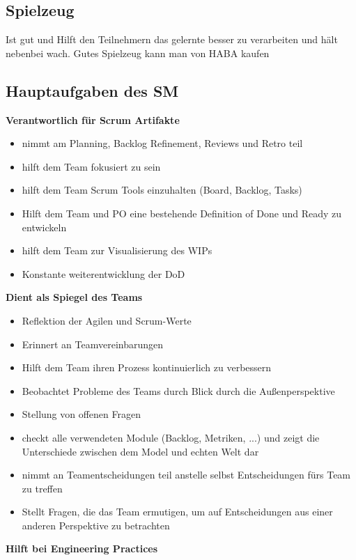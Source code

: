\subsection{Spielzeug}
Ist gut und Hilft den Teilnehmern das gelernte besser zu verarbeiten und hält nebenbei wach.
Gutes Spielzeug kann man von HABA kaufen


\subsection{Hauptaufgaben des SM}

\textbf{Verantwortlich für Scrum Artifakte}
\begin{itemize}
  \item nimmt am Planning, Backlog Refinement, Reviews und Retro teil
  \item hilft dem Team fokusiert zu sein
  \item hilft dem Team Scrum Tools einzuhalten (Board, Backlog, Tasks)
  \item Hilft dem Team und PO eine bestehende Definition of Done und Ready zu entwickeln
  \item hilft dem Team zur Visualisierung des WIPs
  \item Konstante weiterentwicklung der DoD
\end{itemize}


\textbf{Dient als Spiegel des Teams}


\begin{itemize}
  \item Reflektion der Agilen und Scrum-Werte
  \item Erinnert an Teamvereinbarungen
  \item Hilft dem Team ihren Prozess kontinuierlich zu verbessern
  \item Beobachtet Probleme des Teams durch Blick durch die Außenperspektive
  \item Stellung von offenen Fragen
  \item checkt alle verwendeten Module (Backlog, Metriken, ...) und zeigt die Unterschiede zwischen
    dem Model und echten Welt dar
  \item nimmt an Teamentscheidungen teil anstelle selbst Entscheidungen fürs Team zu treffen
  \item Stellt Fragen, die das Team ermutigen, um auf Entscheidungen aus einer anderen Perspektive
    zu betrachten
\end{itemize}


\textbf{Hilft bei Engineering Practices}


